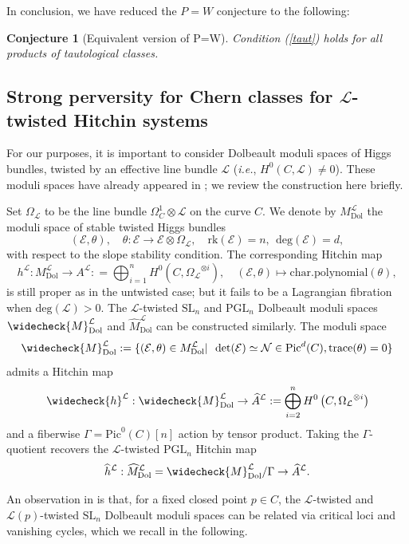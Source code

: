 \documentclass[11pt]{amsart}
\theoremstyle{plain}
\newtheorem{conj}[thm]{Conjecture}
\theoremstyle{definition}
\theoremstyle{remark}
\newcommand{\CE}{{\mathcal E}}
\newcommand{\CL}{{\mathcal L}}
\newcommand{\CN}{{\mathcal N}}
\begin{document}
In conclusion, we have reduced the $P=W$ conjecture to the following:


\begin{conj}[Equivalent version of P=W]\label{conj2.2}
Condition (\ref{taut}) holds for all products of tautological classes.
\end{conj}

\subsection{Strong perversity for Chern classes for $\CL$-twisted Hitchin systems}

For our purposes, it is important to consider Dolbeault moduli spaces of Higgs bundles, twisted by an effective line bundle $\CL$ (\emph{i.e.}, $H^0(C, \CL) \neq 0$). These moduli spaces have already appeared in \cite{CL, HT2, HT, Yun1, Yun2}; we review the construction here briefly. 

Set $\Omega_\CL$ to be the line bundle $\Omega^1_C \otimes \CL$ on the curve $C$. We denote by $M^\CL_{\mathrm{Dol}}$ the moduli space of stable twisted Higgs bundles
\[
(\CE, \theta), \quad \theta: \CE \to \CE \otimes\Omega_\CL, \quad \mathrm{rk}(\CE) = n, ~~\mathrm{deg}(\CE)=d,
\]
with respect to the slope stability condition. The corresponding Hitchin map
\[
h^\CL: M^\CL_{\mathrm{Dol}} \to A^\CL: = \bigoplus_{i=1}^n H^0\left(C, {\Omega_\CL}^{\otimes i} \right) ,\quad (\CE, \theta) \mapsto \mathrm{char.polynomial}(\theta),
\]
is still proper as in the untwisted case; but it fails to be a Lagrangian fibration when $\mathrm{deg}(\CL)>0$. The $\CL$-twisted $\mathrm{SL}_n$ and $\mathrm{PGL}_n$ Dolbeault moduli spaces $\widecheck{M}^\CL_{\mathrm{Dol}}$ and $\widehat{M}^\CL_{\mathrm{Dol}}$ can be constructed similarly. The moduli space
\[
\widecheck{M}^\CL_{\mathrm{Dol}}:= \{(\CE, \theta) \in M^\CL_{\mathrm{Dol}}|~~ \mathrm{det}(\CE) \simeq \CN \in \mathrm{Pic}^d(C), \mathrm{trace}(\theta) = 0\}
\]
admits a Hitchin map
\[
\widecheck{h}^\CL: \widecheck{M}^\CL_{\mathrm{Dol}} \to \widehat{A}^\CL:= \bigoplus_{i=2}^nH^0\left(C, {\Omega_\CL}^{\otimes i} \right)\]
and a fiberwise $\Gamma = \mathrm{Pic}^0(C)[n]$ action by tensor product. Taking the $\Gamma$-quotient recovers the $\CL$-twisted $\mathrm{PGL}_n$ Hitchin map
\[
\widehat{h}^\CL: \widehat{M}^\CL_{\mathrm{Dol}} =\widecheck{M}^\CL_{\mathrm{Dol}}/\Gamma \to \widehat{A}^\CL. 
\]


An observation in \cite[Section 4]{MS} is that, for a fixed closed point $p\in C$, the $\CL$-twisted and $\CL(p)$-twisted $\mathrm{SL}_n$ Dolbeault moduli spaces can be related via critical loci and vanishing cycles, which we recall in the following.
\end{document}
